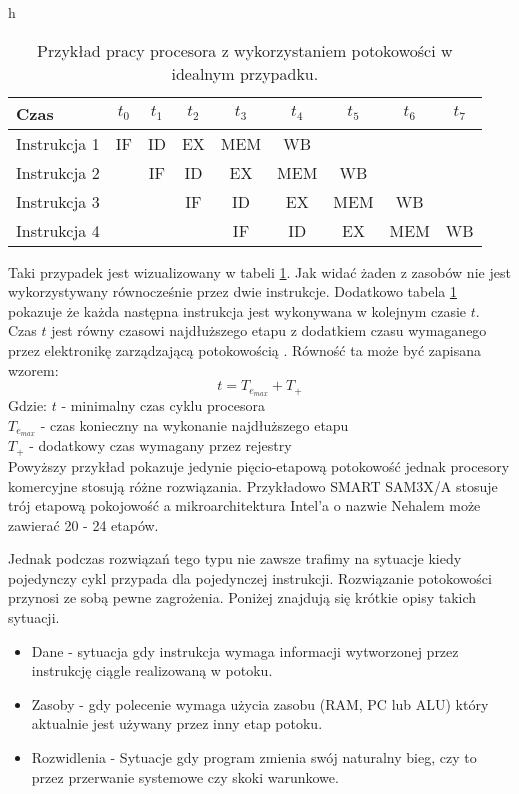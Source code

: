 \begin{table}{h}
        \centering
        \caption{Przykład pracy procesora z wykorzystaniem potokowości w idealnym przypadku.}
        \label{pipelining}
        \begin{tabular}{lcccccccc}
                Czas & $t_0$&$t_1$&$t_2$&$t_3$&$t_4$&$t_5$&$t_6$&$t_7$ \\ \hline
                Instrukcja 1 & IF & ID & EX & MEM & WB &    & \\
                Instrukcja 2 &    & IF & ID & EX & MEM & WB & \\
                Instrukcja 3 &    &    & IF & ID & EX & MEM & WB \\
                Instrukcja 4 &    &    &    & IF & ID & EX & MEM & WB
        \end{tabular}
\end{table}


Taki przypadek jest wizualizowany w tabeli \ref{pipelining}. Jak widać żaden z zasobów nie jest wykorzystywany równocześnie przez dwie instrukcje.
Dodatkowo tabela \ref{pipelining} pokazuje że każda następna instrukcja jest wykonywana w kolejnym czasie $t$. 
Czas $t$ jest równy czasowi najdłuższego etapu z dodatkiem czasu wymaganego przez elektronikę zarządzającą potokowością \cite{arch}.
Równość ta może być zapisana wzorem:
\begin{equation}
        t = T_{e_{max}} + T_{+}
\end{equation}
Gdzie:
        $t$ - minimalny czas cyklu procesora \\
        $T_{e_{max}}$ - czas konieczny na wykonanie najdłuższego etapu \\
        $T_{+}$ - dodatkowy czas wymagany przez rejestry \\


Powyższy przykład pokazuje jedynie pięcio-etapową potokowość jednak procesory komercyjne stosują różne rozwiązania. Przykładowo SMART SAM3X/A stosuje trój etapową pokojowość\cite{datasheet} a mikroarchitektura Intel'a o nazwie Nehalem może zawierać 20 - 24 etapów\cite{pipelining intel}.

Jednak podczas rozwiązań tego typu nie zawsze trafimy na sytuacje kiedy pojedynczy cykl przypada dla pojedynczej instrukcji. 
Rozwiązanie potokowości przynosi ze sobą pewne zagrożenia. Poniżej znajdują się krótkie opisy takich sytuacji. 

\begin{itemize}
        \item Dane - sytuacja gdy instrukcja wymaga informacji wytworzonej przez instrukcję ciągle realizowaną w potoku. 
        \item Zasoby - gdy polecenie wymaga użycia zasobu (RAM, PC lub ALU) który aktualnie jest używany przez inny etap potoku. 
        \item Rozwidlenia - Sytuacje gdy program zmienia swój naturalny bieg, czy to przez przerwanie systemowe czy skoki warunkowe. 
\end{itemize}

